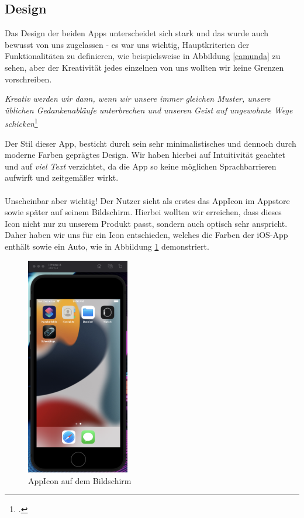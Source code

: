 \subsection{Design}
Das Design der beiden Apps unterscheidet sich stark und das wurde auch bewusst von uns zugelassen - es war uns wichtig, Hauptkriterien der Funktionalitäten zu definieren, wie beispielsweise in Abbildung \ref{camunda} zu sehen, aber der Kreativität jedes einzelnen von uns wollten wir keine Grenzen vorschreiben.
\\
\begin{center}
	\textit{Kreativ werden wir dann, wenn wir unsere immer gleichen Muster, unsere üblichen Gedankenabläufe unterbrechen und unseren Geist auf ungewohnte Wege schicken}\footcite{Bode2022}
\end{center}
Der Stil dieser App, besticht durch sein sehr minimalistisches und dennoch durch moderne Farben geprägtes Design. Wir haben hierbei auf Intuitivität geachtet und auf  \textit{viel Text} verzichtet, da die App so keine möglichen Sprachbarrieren aufwirft und zeitgemäßer wirkt.
\\
\\
Unscheinbar aber wichtig! Der Nutzer sieht als erstes das AppIcon im Appstore sowie später auf seinem Bildschirm. Hierbei wollten wir erreichen, dass dieses Icon nicht nur zu unserem Produkt passt, sondern auch optisch sehr anspricht. Daher haben wir uns für ein Icon entschieden, welches die Farben der iOS-App enthält sowie ein Auto, wie in Abbildung \ref{AppIcon}  demonstriert.
\begin{figure} [H]
	\begin{center}
		\includegraphics[width=0.4\textwidth]{Bilder/iOS_icon.png}
		\caption{AppIcon auf dem Bildschirm}
		\label{AppIcon}
	\end{center}
\end{figure}

